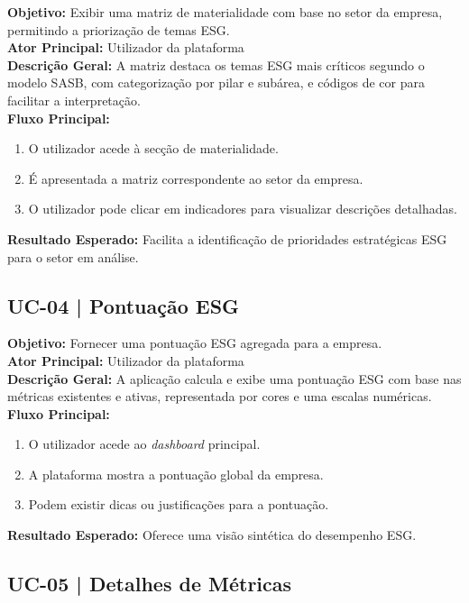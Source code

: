 \textbf{Objetivo:} Exibir uma matriz de materialidade com base no setor da empresa, permitindo a priorização de temas ESG.\\
\textbf{Ator Principal:} Utilizador da plataforma\\
\textbf{Descrição Geral:} A matriz destaca os temas ESG mais críticos segundo o modelo SASB, com categorização por pilar e subárea, e códigos de cor para facilitar a interpretação.\\
\textbf{Fluxo Principal:}
\begin{enumerate}
    \item O utilizador acede à secção de materialidade.
    \item É apresentada a matriz correspondente ao setor da empresa.
    \item O utilizador pode clicar em indicadores para visualizar descrições detalhadas.
\end{enumerate}
\textbf{Resultado Esperado:} Facilita a identificação de prioridades estratégicas ESG para o setor em análise.

\subsection{UC-04 | Pontuação ESG}

\textbf{Objetivo:} Fornecer uma pontuação ESG agregada para a empresa.\\
\textbf{Ator Principal:} Utilizador da plataforma\\
\textbf{Descrição Geral:} A aplicação calcula e exibe uma pontuação ESG com base nas métricas existentes e ativas, representada por cores e uma escalas numéricas.\\
\textbf{Fluxo Principal:}
\begin{enumerate}
    \item O utilizador acede ao \textit{dashboard} principal.
    \item A plataforma mostra a pontuação global da empresa.
    \item Podem existir dicas ou justificações para a pontuação.
\end{enumerate}
\textbf{Resultado Esperado:} Oferece uma visão sintética do desempenho ESG.

\subsection{UC-05 | Detalhes de Métricas}

